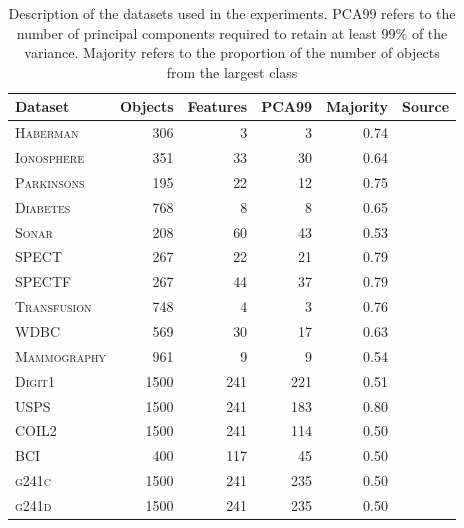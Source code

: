 \documentclass[twoside]{memoir}\usepackage[]{graphicx}\usepackage{xcolor}
\begin{document}
\begin{table}[ht]
\centering
\caption{Description of the datasets used in the experiments. PCA99 refers to the number of principal components required to retain at least 99\% of the variance. Majority refers to the proportion of the number of objects from the largest class} 
\label{table:datasets-icls}
\begin{tabular}{lrrrrr}

  \toprule
Dataset & Objects & Features & PCA99 & Majority & Source \\ 
  \midrule
\textsc{Haberman} & 306 &   3 &   3 & 0.74 & \citep{Lichman2013} \\ 
  \textsc{Ionosphere} & 351 &  33 &  30 & 0.64 & \citep{Lichman2013} \\ 
  \textsc{Parkinsons} & 195 &  22 &  12 & 0.75 & \citep{Lichman2013} \\ 
  \textsc{Diabetes} & 768 &   8 &   8 & 0.65 & \citep{Lichman2013} \\ 
  \textsc{Sonar} & 208 &  60 &  43 & 0.53 & \citep{Lichman2013} \\ 
  \textsc{SPECT} & 267 &  22 &  21 & 0.79 & \citep{Lichman2013} \\ 
  \textsc{SPECTF} & 267 &  44 &  37 & 0.79 & \citep{Lichman2013} \\ 
  \textsc{Transfusion} & 748 &   4 &   3 & 0.76 & \citep{Lichman2013} \\ 
  \textsc{WDBC} & 569 &  30 &  17 & 0.63 & \citep{Lichman2013} \\ 
  \textsc{Mammography} & 961 &   9 &   9 & 0.54 & \citep{Lichman2013} \\ 
  \textsc{Digit1} & 1500 & 241 & 221 & 0.51 & \citep{Chapelle2006} \\ 
  \textsc{USPS} & 1500 & 241 & 183 & 0.80 & \citep{Chapelle2006} \\ 
  \textsc{COIL2} & 1500 & 241 & 114 & 0.50 & \citep{Chapelle2006} \\ 
  \textsc{BCI} & 400 & 117 &  45 & 0.50 & \citep{Chapelle2006} \\ 
  \textsc{g241c} & 1500 & 241 & 235 & 0.50 & \citep{Chapelle2006} \\ 
  \textsc{g241d} & 1500 & 241 & 235 & 0.50 & \citep{Chapelle2006} \\ 
   \bottomrule
\end{tabular}
\end{table}
\end{document}
